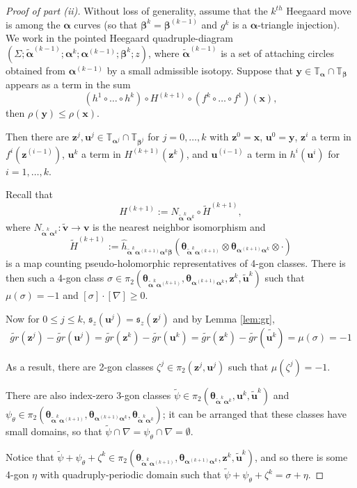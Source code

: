 \documentclass[11pt]{article}
\theoremstyle{plain} \newtheorem{thm}{Theorem}[subsection]
\theoremstyle{plain} \newtheorem{cor}[thm]{Corollary}
\theoremstyle{plain} \newtheorem{prop}[thm]{Proposition}
\theoremstyle{plain} \newtheorem{conj}[thm]{Conjecture}
\theoremstyle{plain} \newtheorem{lem}[thm]{Lemma}
\theoremstyle{definition} \newtheorem{df}[thm]{Definition}
\theoremstyle{remark} \newtheorem{rmk}[thm]{Remark}
\theoremstyle{remark} \newtheorem{obs}[thm]{Observation}
\newcommand{\tld}[1]{\widetilde{#1}}
\newcommand{\ba}{\boldsymbol{\alpha}}
\newcommand{\bb}{\boldsymbol{\beta}}
\newcommand{\bat}{\boldsymbol{\tld{\alpha}}}
\newcommand{\Ta}{\mathbb{T}_{\ba}}
\newcommand{\Tb}{\mathbb{T}_{\bb}}
\newcommand{\bx}{\mathbf{x}}
\newcommand{\by}{\mathbf{y}}
\newcommand{\bbu}{\mathbf{u}}
\newcommand{\bv}{\mathbf{v}}
\newcommand{\bz}{\mathbf{z}}
\newcommand{\thet}[1]{\boldsymbol{\theta}_{#1}}
\newcommand{\tor}[1]{\mathbb{T}_{#1}}
\newcommand{\AD}{\nabla}
\begin{document}
\begin{proof}[Proof of part (ii)]
Without loss of generality, assume that the $k^{th}$ Heegaard move is among the $\ba$ curves (so that $\bb^{k} = \bb^{(k-1)}$ and $g^k$ is a $\ba$-triangle injection).  We work in the pointed Heegaard quadruple-diagram $\left(\Sigma;  \tld{\ba}^{(k-1)}; \ba^{k}; \ba^{(k-1)}; \bb^k; z\right)$, where $\bat^{(k-1)}$ is a set of attaching circles obtained from $\ba^{(k-1)}$ by a small admissible isotopy.  Suppose that $\by \in \Ta \cap \Tb$ appears as a term in the sum
$$\left( h^{1} \circ \ldots \circ h^{k}\right) \circ H^{(k+1)} \circ \left( f^{k} \circ \ldots \circ f^{1}\right)(\bx),$$
then $\rho(\by) \leq \rho(\bx).$

Then there are $\bz^{j}, \bbu^{j} \in \tor{\ba^{j}} \cap \tor{\bb^j}$ for $j = 0, \ldots, k$ with $\bz^{0} = \bx$, $\bbu^{0} = \by$, $\bz^{i}$ a term in $f^{i}(\bz^{(i-1)})$, $\bbu^{k}$ a term in $H^{(k+1)}(\bz^{k})$, and $\bbu^{(i-1)}$ a term in $h^{i}(\bbu^{i})$ for $i = 1, \ldots, k$.

Recall that
$$H^{(k+1)} := N_{\tld{\ba}^{k}\ba^{k}} \circ \tld{H}^{(k+1)},$$
where $N_{\tld{\ba}^{k}\ba^{k}}: \tld{\bv} \rightarrow \bv$ is the nearest neighbor isomorphism and
$$ \tld{H}^{(k+1)}:=\widehat{h}_{\tld{\ba}^{k}\ba^{(k+1)}\ba^{k}\bb} \left( \thet{\tld{\ba}^{k}\ba^{(k+1)}} \otimes \thet{\ba^{(k+1)}\ba^{k}} \otimes \cdot \right)$$
is a map counting pseudo-holomorphic representatives of 4-gon classes.  There is then such a 4-gon class $\sigma \in \pi_{2}(\thet{\bat^{k}\ba^{(k+1)}}, \thet{\ba^{(k+1)}\ba^{k}}, \bz^{k}, \tld{\bbu}^{k})$ such that $\mu(\sigma) = -1$ and $[\sigma] \cdot [\AD] \geq 0$. 

Now for $0 \leq j \leq k$, $\mathfrak{s}_{z}(\bbu^{j}) = \mathfrak{s}_{z}(\bz^{j})$ and by Lemma \ref{lem:gr},
$$\tld{gr}(\bz^{j}) - \tld{gr}(\bbu^{j}) = \tld{gr}(\bz^{k}) - \tld{gr}(\bbu^{k}) = \tld{gr}(\bz^{k}) - \tld{gr}(\tld{\bbu^{k}}) = \mu(\sigma) = -1$$

As a result, there are 2-gon classes $\zeta^{j} \in \pi_{2}( \bz^{j}, \bbu^{j})$ such that $\mu(\zeta^{j}) = -1$.  
 
There are also index-zero 3-gon classes $\tld{\psi} \in \pi_{2}(\thet{\tld{\ba}^{k}\ba^{k}}, \bbu^{k}, \tld{\bbu}^{k})$ and $\psi_{\theta} \in \pi_{2}(\thet{\tld{\ba}^{k}\ba^{(k+1)}}, \thet{\ba^{(k+1)}\ba^{k}}, \thet{\tld{\ba}^{k}\ba^{k}})$; it can be arranged that these classes have small domains, so that $\tld{\psi} \cap \AD = \psi_{\theta} \cap \AD = \emptyset$.

Notice that $\tld{\psi} + \psi_{\theta} + \zeta^{k} \in  \pi_{2}(\thet{\bat^{k}\ba^{(k+1)}}, \thet{\ba^{(k+1)}\ba^{k}}, \bz^{k}, \tld{\bbu}^{k})$, and so there is some 4-gon $\eta$ with quadruply-periodic domain such that $\tld{\psi} + \psi_{\theta} + \zeta^{k} = \sigma + \eta.$


\end{proof}
\end{document}
